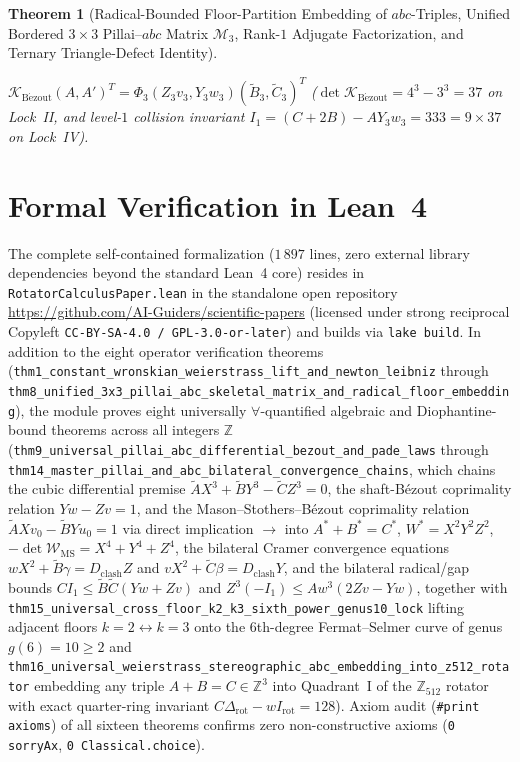 \documentclass[11pt,a4paper]{article}
\theoremstyle{plain}
\newtheorem{theorem}{Theorem}[section]
\theoremstyle{definition}
\begin{document}
\begin{theorem}[Radical-Bounded Floor-Partition Embedding of $abc$-Triples, Unified Bordered $3\times 3$ Pillai--$abc$ Matrix $\mathcal{M}_3$, Rank-$1$ Adjugate Factorization, and Ternary Triangle-Defect Identity]
\begin{enumerate}[label=\textbf{(\roman*)},leftmargin=*]
$\mathcal{K}_{\mathrm{B\acute{e}zout}}(A,A')^T = \Phi_3(Z_3 v_3, Y_3 w_3)(\widetilde{B}_3,\widetilde{C}_3)^T$ ($\det\mathcal{K}_{\mathrm{B\acute{e}zout}} = 4^3-3^3 = 37$ on Lock~II, and level-$1$ collision invariant $I_1 = (C+2B)-A Y_3 w_3 = 333 = 9\times 37$ on Lock~IV).
\end{enumerate}
\end{theorem}

\section{Formal Verification in Lean~4}
\label{sec:lean4}

The complete self-contained formalization ($1\,897$ lines, zero external library dependencies beyond the standard Lean~4 core) resides in \texttt{RotatorCalculusPaper.lean} in the standalone open repository \url{https://github.com/AI-Guiders/scientific-papers} (licensed under strong reciprocal Copyleft \texttt{CC-BY-SA-4.0 / GPL-3.0-or-later}) and builds via \texttt{lake build}. In addition to the eight operator verification theorems (\texttt{thm1\_constant\_wronskian\_weierstrass\_lift\_and\_newton\_leibniz} through \texttt{thm8\_unified\_3x3\_pillai\_abc\_skeletal\_matrix\_and\_radical\_floor\_embedding}), the module proves eight universally $\forall$-quantified algebraic and Diophantine-bound theorems across all integers $\mathbb{Z}$ (\texttt{thm9\_universal\_pillai\_abc\_differential\_bezout\_and\_pade\_laws} through \texttt{thm14\_master\_pillai\_and\_abc\_bilateral\_convergence\_chains}, which chains the cubic differential premise $\widetilde{A}X^3+\widetilde{B}Y^3-\widetilde{C}Z^3=0$, the shaft-B\'ezout coprimality relation $Yw-Zv=1$, and the Mason--Stothers--B\'ezout coprimality relation $\widetilde{A}Xv_0-\widetilde{B}Yu_0=1$ via direct implication $\to$ into $A^*+B^*=C^*$, $W^* = X^2 Y^2 Z^2$, $-\det\mathcal{W}_{\mathrm{MS}} = X^4+Y^4+Z^4$, the bilateral Cramer convergence equations $w X^2 + \widetilde{B}\gamma = D_{\mathrm{clash}} Z$ and $v X^2 + \widetilde{C}\beta = D_{\mathrm{clash}} Y$, and the bilateral radical/gap bounds $C I_1 \le \widetilde{B}\widetilde{C}(Yw+Zv)$ and $Z^3(-I_1) \le A w^3(2Zv-Yw)$, together with \texttt{thm15\_universal\_cross\_floor\_k2\_k3\_sixth\_power\_genus10\_lock} lifting adjacent floors $k=2 \leftrightarrow k=3$ onto the 6th-degree Fermat--Selmer curve of genus $g(6)=10\ge 2$ and \texttt{thm16\_universal\_weierstrass\_stereographic\_abc\_embedding\_into\_z512\_rotator} embedding any triple $A+B=C\in\mathbb{Z}^3$ into Quadrant~I of the $\mathbb{Z}_{512}$ rotator with exact quarter-ring invariant $C\Delta_{\mathrm{rot}} - w I_{\mathrm{rot}} = 128$). Axiom audit (\texttt{\#print axioms}) of all sixteen theorems confirms zero non-constructive axioms (\texttt{0 sorryAx}, \texttt{0 Classical.choice}).
\end{document}

